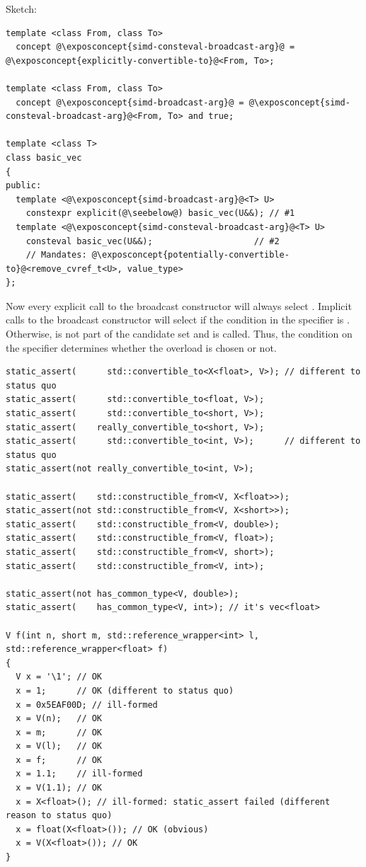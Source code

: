 Sketch:
\medskip\begin{lstlisting}[style=Vc]
template <class From, class To>
  concept @\exposconcept{simd-consteval-broadcast-arg}@ = @\exposconcept{explicitly-convertible-to}@<From, To>;

template <class From, class To>
  concept @\exposconcept{simd-broadcast-arg}@ = @\exposconcept{simd-consteval-broadcast-arg}@<From, To> and true;

template <class T>
class basic_vec
{
public:
  template <@\exposconcept{simd-broadcast-arg}@<T> U>
    constexpr explicit(@\seebelow@) basic_vec(U&&); // #1
  template <@\exposconcept{simd-consteval-broadcast-arg}@<T> U>
    consteval basic_vec(U&&);                    // #2
    // Mandates: @\exposconcept{potentially-convertible-to}@<remove_cvref_t<U>, value_type>
};
\end{lstlisting}

Now every explicit call to the broadcast constructor will always select .
Implicit calls to the broadcast constructor will select  if the condition in the
 specifier is .
Otherwise,  is not part of the candidate set and  is called.
Thus, the condition on the  specifier determines whether the 
overload is chosen or not.

\bigskip
\begin{lstlisting}[style=Vc]
static_assert(      std::convertible_to<X<float>, V>); // different to status quo
static_assert(      std::convertible_to<float, V>);
static_assert(      std::convertible_to<short, V>);
static_assert(    really_convertible_to<short, V>);
static_assert(      std::convertible_to<int, V>);      // different to status quo
static_assert(not really_convertible_to<int, V>);

static_assert(    std::constructible_from<V, X<float>>);
static_assert(not std::constructible_from<V, X<short>>);
static_assert(    std::constructible_from<V, double>);
static_assert(    std::constructible_from<V, float>);
static_assert(    std::constructible_from<V, short>);
static_assert(    std::constructible_from<V, int>);

static_assert(not has_common_type<V, double>);
static_assert(    has_common_type<V, int>); // it's vec<float>

V f(int n, short m, std::reference_wrapper<int> l, std::reference_wrapper<float> f)
{
  V x = '\1'; // OK
  x = 1;      // OK (different to status quo)
  x = 0x5EAF00D; // ill-formed
  x = V(n);   // OK
  x = m;      // OK
  x = V(l);   // OK
  x = f;      // OK
  x = 1.1;    // ill-formed
  x = V(1.1); // OK
  x = X<float>(); // ill-formed: static_assert failed (different reason to status quo)
  x = float(X<float>()); // OK (obvious)
  x = V(X<float>()); // OK
}
\end{lstlisting}

